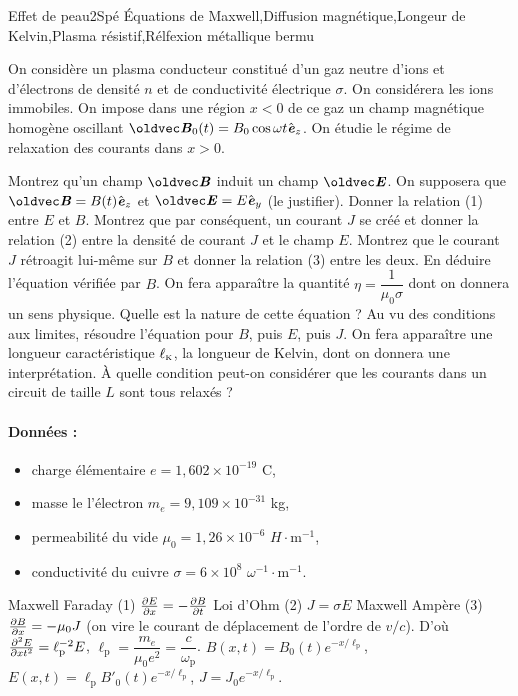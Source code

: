 \begin{exercise}{Effet de peau}{2}{Spé}
{\'Equations de Maxwell,Diffusion magnétique,Longeur de Kelvin,Plasma résistif,Rélfexion métallique }{bermu}

On considère un plasma conducteur constitué d'un gaz neutre d'ions et d'électrons de densité $n$ et de conductivité électrique $\sigma$. On considérera les ions immobiles. On impose dans une région $x<0$ de ce gaz un champ magnétique homogène oscillant $\vB_0(t) = B_0 \cos{\omega t} \ve_z$. On étudie le régime de relaxation des courants dans $x>0$.

\begin{questions}
    \question Montrez qu'un champ $\vB$ induit un champ $\vE$. On supposera que $\vB = B(t)\ve_z$ et $\vE = E\ve_y$ (le justifier). Donner la relation (1) entre $E$ et $B$.
    \question Montrez que par conséquent, un courant $J$ se créé et donner la relation (2) entre la densité de courant $J$ et le champ $E$.
    \question Montrez que le courant $J$ rétroagit lui-même sur $B$ et donner la relation (3) entre les deux.
    \question En déduire l'équation vérifiée par $B$. On fera apparaître la quantité $\eta = \dfrac{1}{\mu_0\sigma}$ dont on donnera un sens physique. Quelle est la nature de cette équation ?
    \question Au vu des conditions aux limites, résoudre l'équation pour $B$, puis $E$, puis $J$. On fera apparaître une longueur caractéristique $\ell_\textsc{k}$, la longueur de Kelvin, dont on donnera une interprétation.
    \question \`A quelle condition peut-on considérer que les courants dans un circuit de taille $L$ sont tous relaxés ?
\end{questions}

\paragraph{Données :}
\begin{itemize}
    \item charge élémentaire $e = 1,602\times 10^{-19}$ C,
    \item masse le l'électron $m_e = 9,109\times 10^{-31}$ kg,
    \item permeabilité du vide $\mu_0 = 1,26 \times 10^{-6}$ $H\cdot$m$^{-1}$,
    \item conductivité du cuivre $\sigma = 6\times 10^8$ $\omega^{-1}\cdot\text{m}^{-1}$.
\end{itemize}
\end{exercise}

\begin{solution}
\begin{questions}
    \question Maxwell Faraday (1) $\pdv{E}{x} = -\pdv{B}{t}$
    \question Loi d'Ohm (2) $J = \sigma E$
    \question Maxwell Ampère (3) $\pdv{B}{x} = -\mu_0 J$ (on vire le courant de déplacement de l'ordre de $v/c$).
    \question D'où $\pdv[2]{E}{xt} = \ell_\text{p}^{-2}E$, $\ell_\text{p} = \dfrac{m_e}{\mu_0 e^2} = \dfrac{c}{\omega_\text{p}}$.
    \question $B(x,t) = B_0(t) e^{-x/\ell_\text{p}}$, $E(x,t) = \ell_\text{p} B'_0(t) e^{-x/\ell_\text{p}}$, $J = J_0 e^{-x/\ell_\text{p}}$.
\end{questions}
\end{solution}
